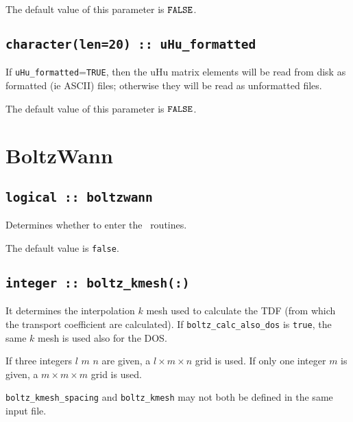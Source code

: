 The default value of this parameter is $\verb#FALSE#$.

\subsection[uHu\_formatted]{\tt character(len=20) :: uHu\_formatted}

If \verb#uHu_formatted#=\verb#TRUE#, then the uHu matrix elements will be
read from disk as formatted (ie ASCII) files; otherwise they will be
read as unformatted files.

The default value of this parameter is $\verb#FALSE#$.







\clearpage
\section{BoltzWann}
\subsection[boltzwann]{\tt logical :: boltzwann}
Determines whether to enter the \bw\ routines.

The default value is \verb#false#.

\subsection[boltz\_kmesh]{\tt integer :: boltz\_kmesh(:)}
It determines the interpolation $k$ mesh used to calculate the TDF (from which the transport coefficient are calculated). If {\tt boltz\_calc\_also\_dos} is \verb#true#, the same $k$ mesh is used also for the DOS.

If three integers $l$ $m$ $n$ are given, a $l\times m\times n$ grid is used. If only one integer $m$ is given, a $m\times m\times m$ grid is used.

{\tt boltz\_kmesh\_spacing} and  {\tt boltz\_kmesh} may not both be defined in the same input file.

